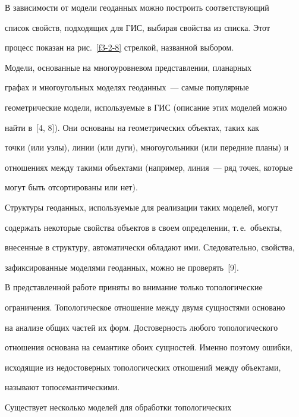     В зависимости от модели геоданных можно построить соответствующий 


список свойств, подходящих для ГИС, выбирая свойства из списка. Этот 


процесс показан на рис.~\ref{f3-2-8} стрелкой, названной выбором.


    


    Модели, основанные на многоуровневом представлении, планарных 


графах и многоугольных моделях геоданных~--- самые популярные 


геометрические модели, используемые в ГИС (описание этих моделей можно 


найти в~[4, 8]). Они основаны на геометрических объектах, таких как 


точки (или узлы), линии (или дуги), многоугольники (или передние планы) и 


отношениях между такими объектами (например, линия~--- ряд точек, которые 


могут быть отсортированы или нет). 


    


    Структуры геоданных, используемые для реализации таких моделей, могут 


содержать некоторые свойства объектов в своем определении, т.\,е.\ объекты, 


внесенные в структуру, автоматически обладают ими. Следовательно, свойства, 


зафиксированные моделями геоданных, можно не проверять~[9]. 


    


    В представленной работе приняты во внимание только топологические 


ограничения. Топологическое отношение между двумя сущностями основано 


на анализе общих частей их форм. Достоверность любого топологического 


отношения основана на семантике обоих сущностей. Именно поэтому ошибки, 


исходящие из недостоверных топологических отношений между объектами, 


называют топосемантическими. 


    


    Существует несколько моделей для обработки топологических 



